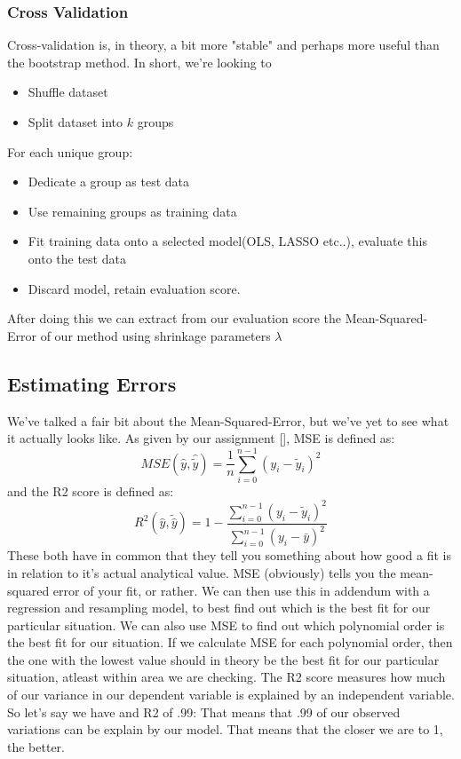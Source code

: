 \documentclass{article}
\begin{document}
\subsubsection{Cross Validation}
Cross-validation is, in theory, a bit more "stable" and perhaps more useful than the bootstrap method. \newline
In short, we're looking to
\begin{itemize}
    \item Shuffle dataset
    \item Split dataset into $k$ groups
\end{itemize}
For each unique group:
\begin{itemize}
    \item Dedicate a group as test data
    \item Use remaining groups as training data
    \item Fit training data onto a selected model(OLS, LASSO etc..), evaluate this onto the test data
    \item Discard model, retain evaluation score.

\end{itemize}
After doing this we can extract from our evaluation score the Mean-Squared-Error of our method using shrinkage parameters $\lambda$
\subsection{Estimating Errors}
We've talked a fair bit about the Mean-Squared-Error, but we've yet to see what it actually looks like. As given by our assignment [\cite{oppgtxt}], MSE is defined as:
\begin{equation*}
    MSE(\hat{y},\hat{\tilde{y}}) = \frac{1}{n}
\sum_{i=0}^{n-1}(y_i-\tilde{y}_i)^2
\end{equation*}
\newline and the R2 score is defined as:
\begin{equation*}
    R^2(\hat{y}, \tilde{\hat{y}}) = 1 - \frac{\sum_{i=0}^{n - 1} (y_i - \tilde{y}_i)^2}{\sum_{i=0}^{n - 1} (y_i - \bar{y})^2}
\end{equation*}
\newline
These both have in common that they tell you something about how good a fit is in relation to it's actual analytical value. MSE (obviously) tells you the mean-squared error of your fit, or rather. We can then use this in addendum with a regression and resampling model, to best find out which is the best fit for our particular situation. We can also use MSE to find out which polynomial order is the best fit for our situation. If we calculate MSE for each polynomial order, then the one with the lowest value should in theory be the best fit for our particular situation, atleast within area we are checking.
\newline
The R2 score measures how much of our variance in our dependent variable is explained by an independent variable. So let's say we have and R2 of .99: That means that .99 of our observed variations can be explain by our model. That means that the closer we are to 1, the better.
\end{document}
